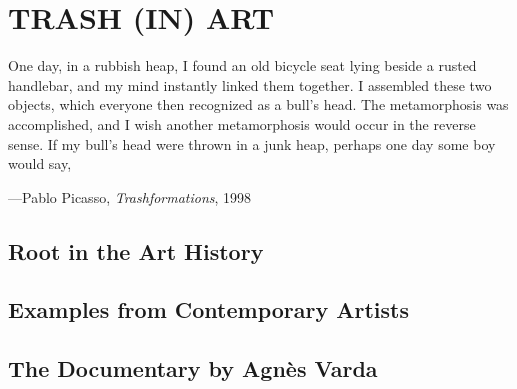 \chapter{TRASH (IN) ART}



\begin{singlespace}
\epigraph{One day, in a rubbish heap, I found an old bicycle seat lying beside a rusted handlebar, and my mind instantly linked them together. I assembled these two objects, which everyone then recognized as a bull’s head. The metamorphosis was accomplished, and I wish another metamorphosis would occur in the reverse sense. If my bull’s head were thrown in a junk heap, perhaps one day some boy would say, }{\hfill ---Pablo Picasso, \textit{Trashformations}, 1998}
\end{singlespace}



\lipsum[1-1]



\section{Root in the Art History}

\lipsum[1-1]


\section{Examples from Contemporary Artists}

\lipsum[2-2]


\section{The Documentary  by Agnès Varda}

\lipsum[3-3]